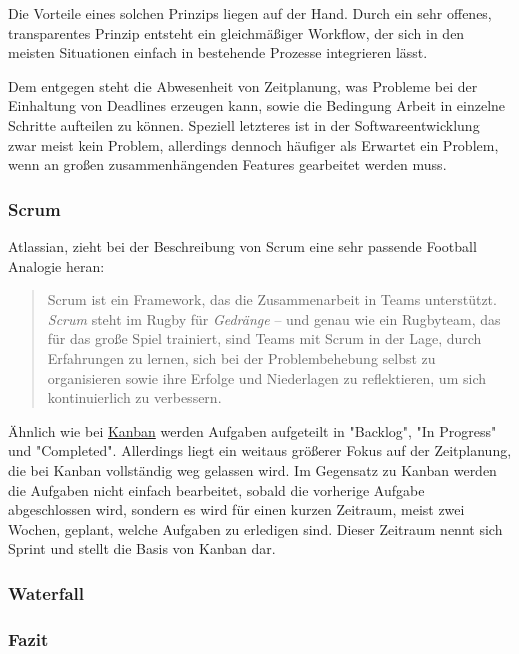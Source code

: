 Die Vorteile eines solchen Prinzips liegen auf der Hand.
Durch ein sehr offenes, transparentes Prinzip entsteht ein gleichmäßiger Workflow, der sich in den meisten Situationen einfach in bestehende Prozesse integrieren lässt.

Dem entgegen steht die Abwesenheit von Zeitplanung, was Probleme bei der Einhaltung von Deadlines erzeugen kann, sowie die Bedingung Arbeit in einzelne Schritte aufteilen zu können.
Speziell letzteres ist in der Softwareentwicklung zwar meist kein Problem, allerdings dennoch häufiger als Erwartet ein Problem, wenn an großen zusammenhängenden Features gearbeitet werden muss.\cite{Kanban}

\subsubsection{Scrum}

Atlassian, zieht bei der Beschreibung von Scrum eine sehr passende Football Analogie heran\cite{atlassianScrumWasEs}:
\begin{quote}
    Scrum ist ein Framework, das die Zusammenarbeit in Teams unterstützt. \textit{Scrum} steht im Rugby für \textit{Gedränge} – und genau wie ein Rugbyteam, das für das große Spiel trainiert, sind Teams mit Scrum in der Lage, durch Erfahrungen zu lernen, sich bei der Problembehebung selbst zu organisieren sowie ihre Erfolge und Niederlagen zu reflektieren, um sich kontinuierlich zu verbessern.
\end{quote}

Ähnlich wie bei \hyperref[subsubsec:kanban]{Kanban} werden Aufgaben aufgeteilt in "Backlog", "In Progress" und "Completed".
Allerdings liegt ein weitaus größerer Fokus auf der Zeitplanung, die bei Kanban vollständig weg gelassen wird.
Im Gegensatz zu Kanban werden die Aufgaben nicht einfach bearbeitet, sobald die vorherige Aufgabe abgeschlossen wird, sondern es wird für einen kurzen Zeitraum, meist zwei Wochen, geplant, welche Aufgaben zu erledigen sind.
Dieser Zeitraum nennt sich Sprint und stellt die Basis von Kanban dar.

\subsubsection{Waterfall}

\subsubsection{Fazit}

